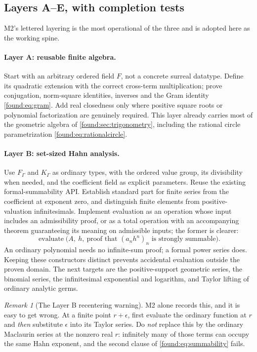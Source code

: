 \documentclass[11pt,letterpaper]{article}
\numberwithin{equation}{section}
\theoremstyle{definition}
\theoremstyle{remark}
\newtheorem{remark}[theorem]{Remark}
\begin{document}
\subsection{Layers A--E, with completion tests}
\label{found:sub:layers}
M2's lettered layering is the most operational of the three and is adopted here
as the working spine.

\paragraph{Layer A: reusable finite algebra.} Start with an arbitrary ordered
field $F$, not a concrete surreal datatype. Define its quadratic extension with
the correct cross-term multiplication; prove conjugation, norm-square
identities, inverses and the Gram identity \eqref{found:eq:gram}. Add real
closedness only where positive square roots or polynomial factorization are
genuinely required. This layer already carries most of the geometric algebra of
\cref{found:sec:trigonometry}, including the rational circle parametrization
\eqref{found:eq:rationalcircle}.

\paragraph{Layer B: set-sized Hahn analysis.} Use $F_\Gamma$ and $K_\Gamma$ as
ordinary types, with the ordered value group, its divisibility when needed, and
the coefficient field as explicit parameters. Reuse the existing
formal-summability API. Establish standard part for finite series from the
coefficient at exponent zero, and distinguish finite elements from
positive-valuation infinitesimals. Implement evaluation as an operation whose
input includes an admissibility proof, or as a total operation with an
accompanying theorem guaranteeing its meaning on admissible inputs; the former
is clearer:
\[
 \operatorname{evaluate}\bigl(A,\ h,\ \text{proof that }(a_nh^n)_n
 \text{ is strongly summable}\bigr).
\]
An ordinary polynomial needs no infinite-sum proof; a formal power series does.
Keeping these constructors distinct prevents accidental evaluation outside the
proven domain. The next targets are the positive-support geometric series, the
binomial series, the infinitesimal exponential and logarithm, and Taylor lifting
of ordinary analytic germs.

\begin{remark}[The Layer B recentering warning]\label{found:rem:recentering}
M2 alone records this, and it is easy to get wrong. At a finite point
$r+\epsilon$, first evaluate the ordinary function at $r$ and \emph{then}
substitute $\epsilon$ into its Taylor series. Do \emph{not} replace this by the
ordinary Maclaurin series at the nonzero real $r$: infinitely many of those
terms can occupy the same Hahn exponent, and the second clause of
\eqref{found:eq:summability} fails.
\end{remark}
\end{document}
